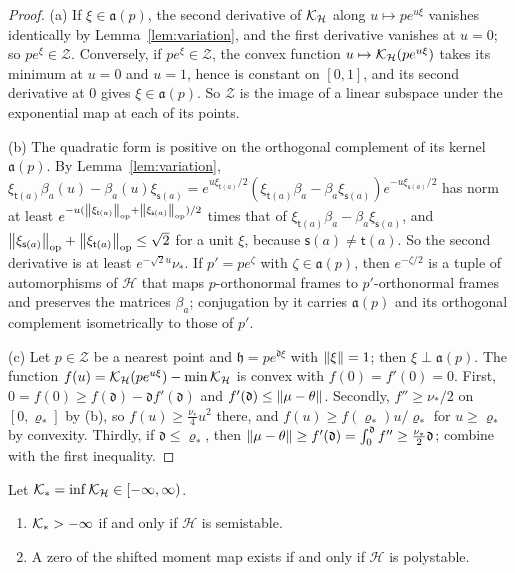 \begin{proof}
(a) If $\xi\in\mathfrak a(p)$, the second derivative of $\mathcal K_{\mathcal H}$
along $u\mapsto pe^{u\xi}$ vanishes identically by
Lemma~\ref{lem:variation}, and the first derivative vanishes at $u=0$; so
$pe^\xi\in\mathcal Z$. Conversely, if $pe^\xi\in\mathcal Z$, the convex
function $u\mapsto\mathcal K_{\mathcal H}(pe^{u\xi})$ takes its minimum at $u=0$ and
$u=1$, hence is constant on $[0,1]$, and its second derivative at $0$ gives
$\xi\in\mathfrak a(p)$. So $\mathcal Z$ is the image of a linear subspace
under the exponential map at each of its points.

(b) The quadratic form is positive on the orthogonal complement of its kernel
$\mathfrak a(p)$. By Lemma~\ref{lem:variation},
$\xi_{\mathsf t(a)}\beta_a(u)-\beta_a(u)\xi_{\mathsf s(a)}
=e^{u\xi_{\mathsf t(a)}/2}(\xi_{\mathsf t(a)}\beta_a-\beta_a\xi_{\mathsf s(a)})e^{-u\xi_{\mathsf s(a)}/2}$
has norm at least
$e^{-u(\left\lVert\xi_{\mathsf t(a)}\right\rVert_{\mathrm{op}}+\left\lVert\xi_{\mathsf s(a)}\right\rVert_{\mathrm{op}})/2}$
times that of $\xi_{\mathsf t(a)}\beta_a-\beta_a\xi_{\mathsf s(a)}$, and
$\left\lVert\xi_{\mathsf s(a)}\right\rVert_{\mathrm{op}}+\left\lVert\xi_{\mathsf t(a)}\right\rVert_{\mathrm{op}}\leq\sqrt2$
for a unit $\xi$, because $\mathsf s(a)\neq\mathsf t(a)$. So the second
derivative is at least $e^{-\sqrt2u}\nu_*$. If $p'=pe^\zeta$ with
$\zeta\in\mathfrak a(p)$, then $e^{-\zeta/2}$ is a tuple of automorphisms of
$\mathcal H$ that maps $p$-orthonormal frames to $p'$-orthonormal frames and
preserves the matrices $\beta_a$; conjugation by it carries $\mathfrak a(p)$
and its orthogonal complement isometrically to those of $p'$.

(c) Let $p\in\mathcal Z$ be a nearest point and
$\mathfrak h=pe^{\mathfrak d\xi}$ with $\left\lVert\xi\right\rVert=1$; then
$\xi\perp\mathfrak a(p)$. The function
$f(u)=\mathcal K_{\mathcal H}(pe^{u\xi})-\min\mathcal K_{\mathcal H}$ is convex with
$f(0)=f'(0)=0$. First, $0=f(0)\geq f(\mathfrak d)-\mathfrak df'(\mathfrak d)$
and $f'(\mathfrak d)\leq\left\lVert\mu-\theta\right\rVert$. Secondly,
$f''\geq\nu_*/2$ on $[0,\varrho_*]$ by (b), so $f(u)\geq\frac{\nu_*}4u^2$
there, and $f(u)\geq f(\varrho_*)u/\varrho_*$ for $u\geq\varrho_*$ by
convexity. Thirdly, if $\mathfrak d\leq\varrho_*$, then
$\left\lVert\mu-\theta\right\rVert\geq f'(\mathfrak d)=\int_0^{\mathfrak d}f''\geq\frac{\nu_*}2\mathfrak d$;
combine with the first inequality.
\end{proof}

\begin{lemma}\label{lem:king}
Let $\mathcal K_*=\inf\mathcal K_{\mathcal H}\in[-\infty,\infty)$.
\begin{enumerate}
\item[(a)] $\mathcal K_*>-\infty$ if and only if $\mathcal H$ is semistable.
\item[(b)] A zero of the shifted moment map exists if and only if $\mathcal H$ is
 polystable.
\end{enumerate}
\end{lemma}

